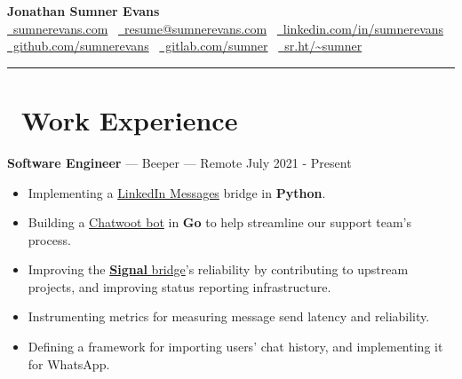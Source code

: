 \documentclass[10pt,letterpaper]{article}
\begin{document}
\begin{center}
    {\huge\textbf{Jonathan Sumner Evans}} \\
    \vspace{3pt}
    \href{https://sumnerevans.com}{\faGlobe\ sumnerevans.com}
    \textbar\ \href{mailto:resume@sumnerevans.com}{\faEnvelope\ resume@sumnerevans.com}
    \textbar\ \href{https://www.linkedin.com/in/sumnerevans}{\faLinkedin\ linkedin.com/in/sumnerevans} \\
    \href{https://github.com/sumnerevans}{\faGithub\ github.com/sumnerevans}
    \textbar\ \href{https://gitlab.com/sumner}{\faGitlab\ gitlab.com/sumner}
    \textbar\ \href{https://sr.ht/~sumner}{\faCodeFork\ sr.ht/{\textasciitilde}sumner}
    \rule{\textwidth}{0.5pt}
\end{center}

\section*{\faBriefcase\ Work Experience}
\textbf{Software Engineer} --- Beeper --- Remote
\hfill July 2021 - Present
\begin{itemize}
    \item Implementing a \href{https://gitlab.com/beeper/linkedin}{LinkedIn
        Messages} bridge in \textbf{Python}.
    \item Building a \href{https://gitlab.com/beeper/chatwoot}{Chatwoot bot}
        in \textbf{Go} to help streamline our support team's process. 
    \item Improving the \href{https://github.com/mautrix/signal}{\textbf{Signal}
        bridge}'s reliability by contributing to upstream projects, and
        improving status reporting infrastructure.
    \item Instrumenting metrics for measuring message send latency and
        reliability.
    \item Defining a framework for importing users' chat history, and
        implementing it for WhatsApp.
\end{itemize}
\end{document}
